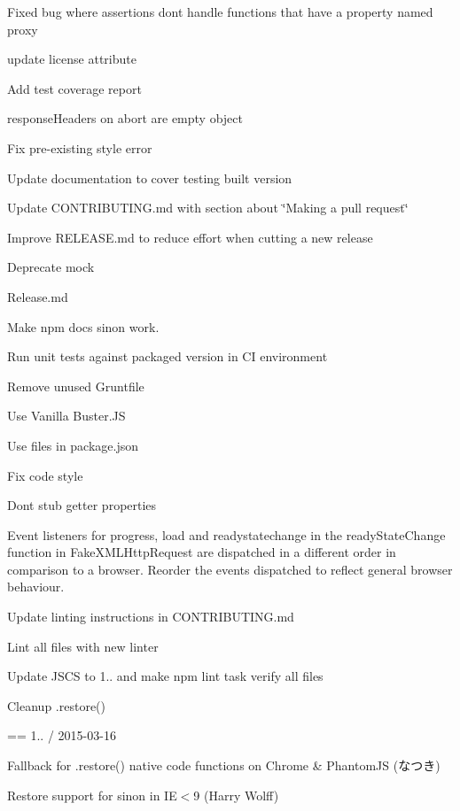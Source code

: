 \begin{DoxyItemize}
\item Fixed bug where assertions don\textquotesingle{}t handle functions that have a property named proxy
\item update license attribute
\item Add test coverage report
\item response\+Headers on abort are empty object
\item Fix pre-\/existing style error
\item Update documentation to cover testing built version
\item Update C\+O\+N\+T\+R\+I\+B\+U\+T\+I\+N\+G.\+md with section about \char`\"{}\+Making a pull request\char`\"{}
\item Improve R\+E\+L\+E\+A\+S\+E.\+md to reduce effort when cutting a new release
\item Deprecate mock
\item Release.\+md
\item Make {\ttfamily npm docs sinon} work.
\item Run unit tests against packaged version in CI environment
\item Remove unused Gruntfile
\item Use Vanilla Buster.\+JS
\item Use {\ttfamily files} in package.\+json
\item Fix code style
\item Don\textquotesingle{}t stub getter properties
\item Event listeners for {\ttfamily progress}, {\ttfamily load} and {\ttfamily readystatechange} in the {\ttfamily ready\+State\+Change} function in {\ttfamily Fake\+X\+M\+L\+Http\+Request} are dispatched in a different order in comparison to a browser. Reorder the events dispatched to reflect general browser behaviour.
\item Update linting instructions in C\+O\+N\+T\+R\+I\+B\+U\+T\+I\+N\+G.\+md
\item Lint all files with new linter
\item Update J\+S\+CS to 1.. and make npm lint task verify all files
\item Cleanup .restore()
\end{DoxyItemize}

== 1.. / 2015-\/03-\/16
\begin{DoxyItemize}
\item Fallback for .restore() native code functions on Chrome \& Phantom\+JS (なつき)
\item Restore support for sinon in IE$<$9 (Harry Wolff)
\end{DoxyItemize}

